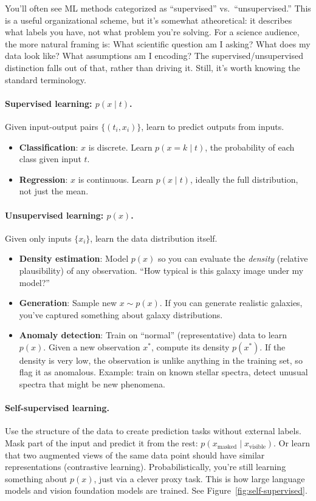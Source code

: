 \documentclass[11pt]{article}
\begin{document}
You'll often see ML methods categorized as ``supervised'' vs.\ ``unsupervised.'' This is a useful organizational scheme, but it's somewhat atheoretical: it describes what labels you have, not what problem you're solving. For a science audience, the more natural framing is: What scientific question am I asking? What does my data look like? What assumptions am I encoding? The supervised/unsupervised distinction falls out of that, rather than driving it. Still, it's worth knowing the standard terminology.

\paragraph{Supervised learning: $p(x \mid t)$.} Given input-output pairs $\{(t_i, x_i)\}$, learn to predict outputs from inputs.
\begin{itemize}
    \item \textbf{Classification}: $x$ is discrete. Learn $p(x = k \mid t)$, the probability of each class given input $t$.
    \item \textbf{Regression}: $x$ is continuous. Learn $p(x \mid t)$, ideally the full distribution, not just the mean.
\end{itemize}

\paragraph{Unsupervised learning: $p(x)$.} Given only inputs $\{x_i\}$, learn the data distribution itself.
\begin{itemize}
    \item \textbf{Density estimation}: Model $p(x)$ so you can evaluate the \emph{density} (relative plausibility) of any observation. ``How typical is this galaxy image under my model?''
    \item \textbf{Generation}: Sample new $x \sim p(x)$. If you can generate realistic galaxies, you've captured something about galaxy distributions.
    \item \textbf{Anomaly detection}: Train on ``normal'' (representative) data to learn $p(x)$. Given a new observation $x^*$, compute its density $p(x^*)$. If the density is very low, the observation is unlike anything in the training set, so flag it as anomalous. Example: train on known stellar spectra, detect unusual spectra that might be new phenomena.
\end{itemize}

\paragraph{Self-supervised learning.} Use the structure of the data to create prediction tasks without external labels. Mask part of the input and predict it from the rest: $p(x_{\text{masked}} \mid x_{\text{visible}})$. Or learn that two augmented views of the same data point should have similar representations (contrastive learning). Probabilistically, you're still learning something about $p(x)$, just via a clever proxy task. This is how large language models and vision foundation models are trained. See Figure~\ref{fig:self-supervised}.
\end{document}
